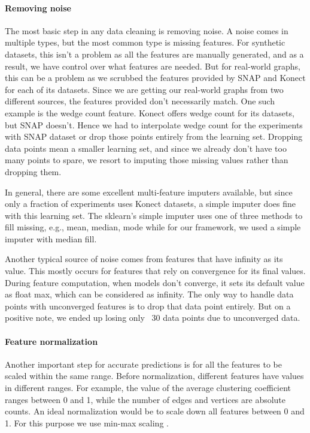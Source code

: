 \paragraph{Removing noise}
The most basic step in any data cleaning is removing noise. A noise comes in multiple types, but the most common type is missing features. For synthetic datasets, this isn't a problem as all the features are manually generated, and as a result, we have control over what features are needed. But for real-world graphs, this can be a problem as we scrubbed the features provided by SNAP and Konect for each of its datasets. Since we are getting our real-world graphs from two different sources, the features provided don't necessarily match. One such example is the wedge count feature. Konect offers wedge count for its datasets, but SNAP doesn't. Hence we had to interpolate wedge count for the experiments with SNAP dataset or drop those points entirely from the learning set. Dropping data points mean a smaller learning set, and since we already don't have too many points to spare, we resort to imputing those missing values rather than dropping them. 

In general, there are some excellent multi-feature imputers available, but since only a fraction of experiments uses Konect datasets, a simple imputer does fine with this learning set. The sklearn's simple imputer uses one of three methods to fill missing, e.g., mean, median, mode while for our framework, we used a simple imputer with median fill. 

Another typical source of noise comes from features that have infinity as its value. This mostly occurs for features that rely on convergence for its final values. During feature computation, when models don't converge, it sets its default value as float max, which can be considered as infinity. The only way to handle data points with unconverged features is to drop that data point entirely. But on a positive note, we ended up losing only ~30 data points due to unconverged data.

\paragraph{Feature normalization}
Another important step for accurate predictions is for all the features to be scaled within the same range. Before normalization, different features have values in different ranges. For example, the value of the average clustering coefficient ranges between 0 and 1, while the number of edges and vertices are absolute counts. An ideal normalization would be to scale down all features between 0 and 1. For this purpose we use min-max scaling .

